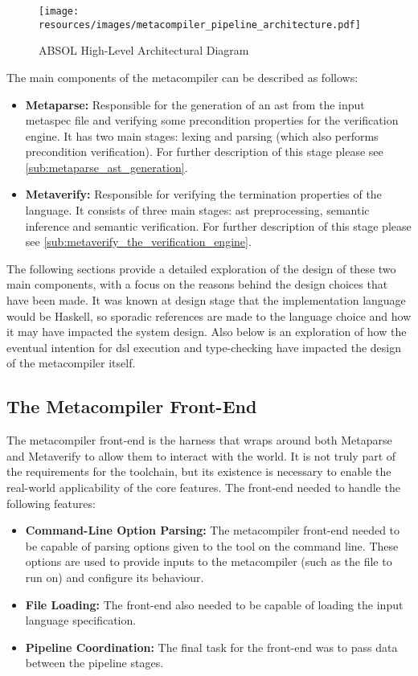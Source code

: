 \begin{figure}[!htb]
    \centering
    \texttt{[image: resources/images/metacompiler\_pipeline\_architecture.pdf]}
    \caption{ABSOL High-Level Architectural Diagram}
    \label{fig:absol_high_level_architectural_diagram}
\end{figure}

The main components of the metacompiler can be described as follows:
\begin{itemize}
    \item \textbf{Metaparse:} Responsible for the generation of an \gls{ast} from the input metaspec file and verifying some precondition properties for the verification engine. 
    It has two main stages: lexing and parsing (which also performs precondition verification). 
    For further description of this stage please see \autoref{sub:metaparse_ast_generation}.
    \item \textbf{Metaverify:} Responsible for verifying the termination properties of the language.
    It consists of three main stages: \gls{ast} preprocessing, semantic inference and semantic verification.
    For further description of this stage please see \autoref{sub:metaverify_the_verification_engine}.
\end{itemize}

The following sections provide a detailed exploration of the design of these two main components, with a focus on the reasons behind the design choices that have been made.
It was known at design stage that the implementation language would be Haskell, so sporadic references are made to the language choice and how it may have impacted the system design.
Also below is an exploration of how the eventual intention for \gls{dsl} execution and type-checking have impacted the design of the metacompiler itself. 

\subsection{The Metacompiler Front-End} %
\label{sub:the_metacompiler_front_end}
The metacompiler front-end is the harness that wraps around both Metaparse and Metaverify to allow them to interact with the world. 
It is not truly part of the requirements for the toolchain, but its existence is necessary to enable the real-world applicability of the core features.
The front-end needed to handle the following features:
\begin{itemize}
    \item \textbf{Command-Line Option Parsing:} The metacompiler front-end needed to be capable of parsing options given to the tool on the command line.
    These options are used to provide inputs to the metacompiler (such as the file to run on) and configure its behaviour. 
    \item \textbf{File Loading:} The front-end also needed to be capable of loading the input language specification.
    \item \textbf{Pipeline Coordination:} The final task for the front-end was to pass data between the pipeline stages.
\end{itemize}


